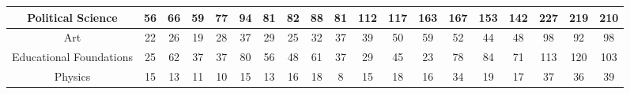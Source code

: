 \documentclass[10pt]{article}
\begin{document}
\begin{landscape}
\begin{longtable}[c]{|ccccccccccccccccccc|}
	\multicolumn{1}{|c|}{Political Science}                          & \multicolumn{1}{c|}{56}         & \multicolumn{1}{c|}{66}         & \multicolumn{1}{c|}{59}         & \multicolumn{1}{c|}{77}         & \multicolumn{1}{c|}{94}         & \multicolumn{1}{c|}{81}         & \multicolumn{1}{c|}{82}         & \multicolumn{1}{c|}{88}         & \multicolumn{1}{c|}{81}         & \multicolumn{1}{c|}{112}        & \multicolumn{1}{c|}{117}        & \multicolumn{1}{c|}{163}        & \multicolumn{1}{c|}{167}        & \multicolumn{1}{c|}{153}        & \multicolumn{1}{c|}{142}        & \multicolumn{1}{c|}{227}        & \multicolumn{1}{c|}{219}        & 210        \\ \hline
	\multicolumn{1}{|c|}{Art}                                        & \multicolumn{1}{c|}{22}         & \multicolumn{1}{c|}{26}         & \multicolumn{1}{c|}{19}         & \multicolumn{1}{c|}{28}         & \multicolumn{1}{c|}{37}         & \multicolumn{1}{c|}{29}         & \multicolumn{1}{c|}{25}         & \multicolumn{1}{c|}{32}         & \multicolumn{1}{c|}{37}         & \multicolumn{1}{c|}{39}         & \multicolumn{1}{c|}{50}         & \multicolumn{1}{c|}{59}         & \multicolumn{1}{c|}{52}         & \multicolumn{1}{c|}{44}         & \multicolumn{1}{c|}{48}         & \multicolumn{1}{c|}{98}         & \multicolumn{1}{c|}{92}         & 98         \\ \hline
	\multicolumn{1}{|c|}{Educational Foundations}                    & \multicolumn{1}{c|}{25}         & \multicolumn{1}{c|}{62}         & \multicolumn{1}{c|}{37}         & \multicolumn{1}{c|}{37}         & \multicolumn{1}{c|}{80}         & \multicolumn{1}{c|}{56}         & \multicolumn{1}{c|}{48}         & \multicolumn{1}{c|}{61}         & \multicolumn{1}{c|}{37}         & \multicolumn{1}{c|}{29}         & \multicolumn{1}{c|}{45}         & \multicolumn{1}{c|}{23}         & \multicolumn{1}{c|}{78}         & \multicolumn{1}{c|}{84}         & \multicolumn{1}{c|}{71}         & \multicolumn{1}{c|}{113}        & \multicolumn{1}{c|}{120}        & 103        \\ \hline
	\multicolumn{1}{|c|}{Physics}                                    & \multicolumn{1}{c|}{15}         & \multicolumn{1}{c|}{13}         & \multicolumn{1}{c|}{11}         & \multicolumn{1}{c|}{10}         & \multicolumn{1}{c|}{15}         & \multicolumn{1}{c|}{13}         & \multicolumn{1}{c|}{16}         & \multicolumn{1}{c|}{18}         & \multicolumn{1}{c|}{8}          & \multicolumn{1}{c|}{15}         & \multicolumn{1}{c|}{18}         & \multicolumn{1}{c|}{16}         & \multicolumn{1}{c|}{34}         & \multicolumn{1}{c|}{19}         & \multicolumn{1}{c|}{17}         & \multicolumn{1}{c|}{37}         & \multicolumn{1}{c|}{36}         & 39         \\ \hline

\end{longtable}
\end{landscape}
\end{document}
